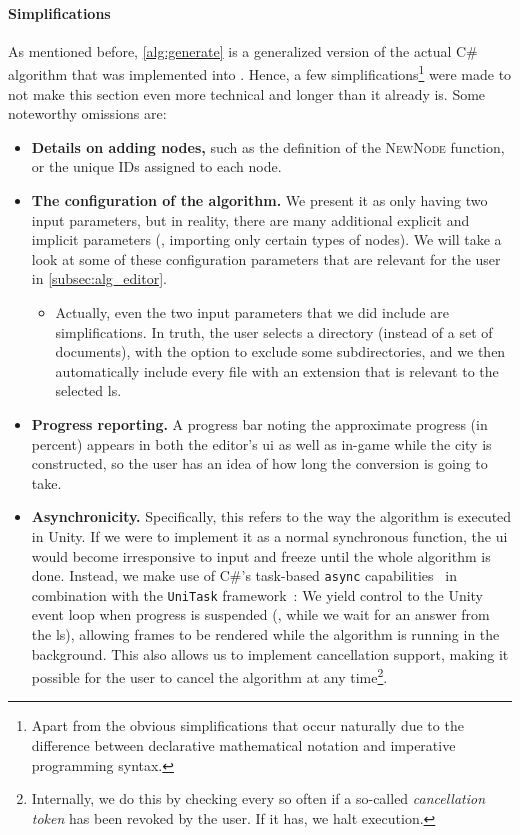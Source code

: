 \documentclass[../thesis]{subfiles}
\begin{document}
\paragraph{Simplifications}
As mentioned before, \cref{alg:generate} is a generalized version of the actual C\# algorithm that was implemented into \SEE{}.
Hence, a few simplifications\footnote{
	Apart from the obvious simplifications that occur naturally due to the difference between declarative mathematical notation and imperative programming syntax.
} were made to not make this section even more technical and longer than it already is.
Some noteworthy omissions are:
\begin{itemize}
	\item \textbf{Details on adding nodes,} such as the definition of the \textsc{NewNode} function, or the unique IDs assigned to each node.
	\item \textbf{The configuration of the algorithm.} We present it as only having two input parameters, but in reality, there are many additional explicit and implicit parameters (\eg, importing only certain types of nodes).
	      We will take a look at some of these configuration parameters that are relevant for the user in \cref{subsec:alg_editor}.
	      \begin{itemize}
		      \item Actually, even the two input parameters that we did include are simplifications.
		            In truth, the user selects a directory (instead of a set of documents), with the option to exclude some subdirectories, and we then automatically include every file with an extension that is relevant to the selected \gls{ls}.
	      \end{itemize}
	\item \textbf{Progress reporting.}
	      A progress bar noting the approximate progress (in percent) appears in both the \gls{editor}'s \gls{ui} as well as in-game while the \gls{city} is constructed, so the user has an idea of how long the conversion is going to take.
	\item \textbf{Asynchronicity.}
	      Specifically, this refers to the way the algorithm is executed in Unity.
	      If we were to implement it as a normal synchronous function, the \gls{ui} would become irresponsive to input and freeze until the whole algorithm is done.
	      Instead, we make use of C\#'s task-based \texttt{async} capabilities~\cite{wagner2023} in combination with the \texttt{UniTask} framework~\cite{kawai2024}:
	      We yield control to the Unity event loop when progress is suspended (\eg{}, while we wait for an answer from the \gls{ls}), allowing frames to be rendered while the algorithm is running in the background.
	      This also allows us to implement cancellation support, making it possible for the user to cancel the algorithm at any time\footnote{
		      Internally, we do this by checking every so often if a so-called \emph{cancellation token} has been revoked by the user. If it has, we halt execution.
	      }.
\end{itemize}
\end{document}
